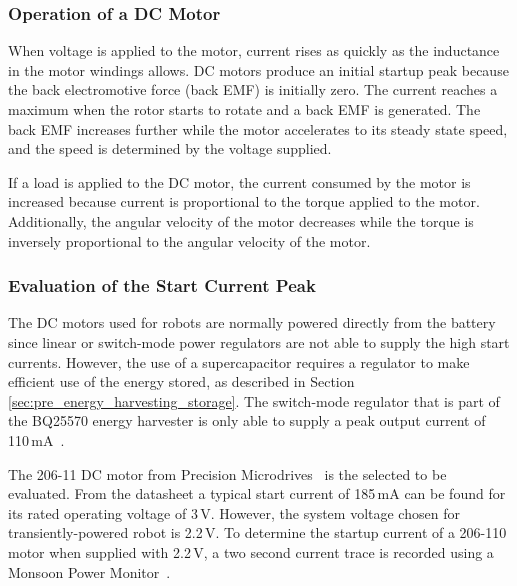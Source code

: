 \subsubsection{Operation of a DC Motor}

When voltage is applied to the motor, current rises as quickly as the inductance in the motor windings allows.
DC motors produce an initial startup peak because the back electromotive force (back EMF) is initially zero.
The current reaches a maximum when the rotor starts to rotate and a back EMF is generated.
The back EMF increases further while the motor accelerates to its steady state speed, and the speed is determined by the voltage supplied.

If a load is applied to the DC motor, the current consumed by the motor is increased because current is proportional to the torque applied to the motor.
Additionally, the angular velocity of the motor decreases while the torque is inversely proportional to the angular velocity of the motor.

\subsubsection{Evaluation of the Start Current Peak}
The DC motors used for robots are normally powered directly from the battery since linear or switch-mode power regulators are not able to supply the high start currents.
However, the use of a supercapacitor requires a regulator to make efficient use of the energy stored, as described in Section \ref{sec:pre_energy_harvesting_storage}.
The switch-mode regulator that is part of the BQ25570 energy harvester is only able to supply a peak output current of 110\,mA~\cite{bq25570_2017}.

The 206-11 DC motor from Precision Microdrives~\cite{gearmotor_206-110_2017} is the selected to be evaluated.
From the datasheet a typical start current of 185\,mA can be found for its rated operating voltage of 3\,V.
However, the system voltage chosen for transiently-powered robot is 2.2\,V.
To determine the startup current of a 206-110 motor when supplied with 2.2\,V, a two second current trace is recorded using a Monsoon Power Monitor~\cite{monsoon_powermonitor_2017}.

